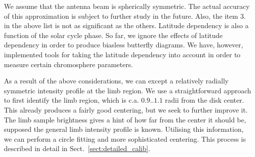 \documentclass{aa}
\begin{document}
We assume that the antenna beam is spherically symmetric. The actual accuracy of this approximation is subject to 
further study in the future. Also, the item 3. in the above list is not as significant as the others. Latitude 
dependency is also a function of the solar cycle phase. So far, we ignore the effects of latitude dependency in order to 
produce biasless butterfly diagrams. We have, however, implemented tools for taking the latitude dependency into account 
in order to measure certain chromosphere parameters.

As a result of the above considerations, we can except a relatively radially symmetric intensity profile at the limb 
region. We use a straightforward approach to first identify the limb region, which is c.a. $0.9 .. 1.1$ radii from the 
disk center. This already produces a fairly good centering, but we seek to further improve it. The limb sample 
brightness gives a hint of how far from the center it should be, supposed the general limb intensity profile is known. 
Utilising this information, we can perform a circle fitting and more sophisticated centering. This process is described 
in detail in Sect.~\ref{sect:detailed_calib}.
\end{document}
